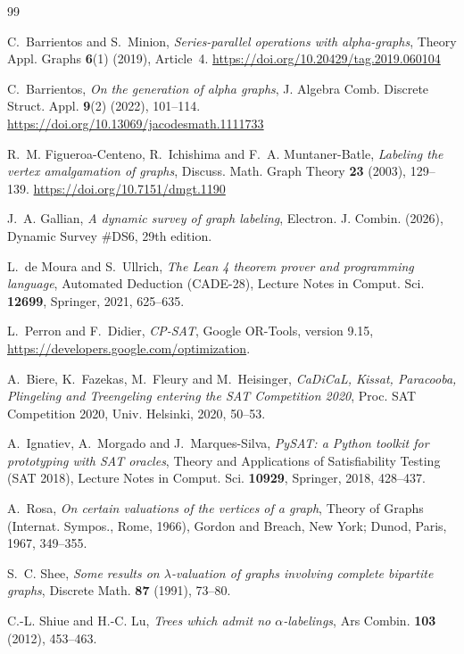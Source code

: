 \documentclass[11pt]{amsart}
\theoremstyle{definition}
\theoremstyle{remark}
\begin{document}
\begin{thebibliography}{99}

C.~Barrientos and S.~Minion,
\emph{Series-parallel operations with alpha-graphs},
Theory Appl. Graphs \textbf{6}(1) (2019), Article~4.
\url{https://doi.org/10.20429/tag.2019.060104}

C.~Barrientos,
\emph{On the generation of alpha graphs},
J. Algebra Comb. Discrete Struct. Appl. \textbf{9}(2) (2022), 101--114.
\url{https://doi.org/10.13069/jacodesmath.1111733}

R.~M. Figueroa-Centeno, R.~Ichishima and F.~A. Muntaner-Batle,
\emph{Labeling the vertex amalgamation of graphs},
Discuss. Math. Graph Theory \textbf{23} (2003), 129--139.
\url{https://doi.org/10.7151/dmgt.1190}

J.~A. Gallian,
\emph{A dynamic survey of graph labeling},
Electron. J. Combin. (2026), Dynamic Survey \#DS6, 29th edition.

L.~de Moura and S.~Ullrich,
\emph{The Lean 4 theorem prover and programming language},
Automated Deduction (CADE-28), Lecture Notes in Comput. Sci. \textbf{12699}, Springer, 2021, 625--635.

L.~Perron and F.~Didier,
\emph{CP-SAT}, Google OR-Tools, version 9.15,
\url{https://developers.google.com/optimization}.

A.~Biere, K.~Fazekas, M.~Fleury and M.~Heisinger,
\emph{CaDiCaL, Kissat, Paracooba, Plingeling and Treengeling entering the SAT Competition 2020},
Proc. SAT Competition 2020, Univ. Helsinki, 2020, 50--53.

A.~Ignatiev, A.~Morgado and J.~Marques-Silva,
\emph{PySAT: a Python toolkit for prototyping with SAT oracles},
Theory and Applications of Satisfiability Testing (SAT 2018), Lecture Notes in Comput. Sci. \textbf{10929}, Springer, 2018, 428--437.

A.~Rosa,
\emph{On certain valuations of the vertices of a graph},
Theory of Graphs (Internat. Sympos., Rome, 1966), Gordon and Breach, New York; Dunod, Paris, 1967, 349--355.

S.~C. Shee,
\emph{Some results on $\lambda$-valuation of graphs involving complete bipartite graphs},
Discrete Math. \textbf{87} (1991), 73--80.

C.-L. Shiue and H.-C. Lu,
\emph{Trees which admit no $\alpha$-labelings},
Ars Combin. \textbf{103} (2012), 453--463.

\end{thebibliography}
\end{document}
